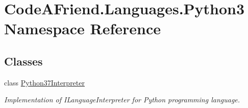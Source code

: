 \hypertarget{namespace_code_a_friend_1_1_languages_1_1_python3}{}\section{Code\+A\+Friend.\+Languages.\+Python3 Namespace Reference}
\label{namespace_code_a_friend_1_1_languages_1_1_python3}
\subsection*{Classes}
\begin{DoxyCompactItemize}
\item 
class \mbox{\hyperlink{class_code_a_friend_1_1_languages_1_1_python3_1_1_python37_interpreter}{Python37\+Interpreter}}
\begin{DoxyCompactList}\small\item\em Implementation of I\+Language\+Interpreter for Python programming language. \end{DoxyCompactList}\end{DoxyCompactItemize}
